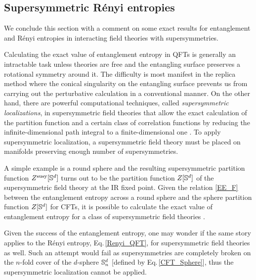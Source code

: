 \subsection{Supersymmetric R{\'e}nyi entropies}\label{ss:SRE}
We conclude this section with a comment on some exact results for entanglement and R{\'e}nyi entropies in interacting field theories with supersymmetries.

Calculating the exact value of entanglement entropy in QFTs is generally an intractable task unless theories are free and the entangling surface preserves a rotational symmetry around it.
The difficulty is most manifest in the replica method where the conical singularity on the entangling surface prevents us from carrying out the perturbative calculation in a conventional manner.
On the other hand, there are powerful computational techniques, called \emph{supersymmetric localizations}, in supersymmetric field theories that allow the exact calculation of the partition function and a certain class of correlation functions by reducing the infinite-dimensional path integral to a finite-dimensional one \cite{Willett:2016adv,Dumitrescu:2016ltq,Pufu:2016zxm}.
To apply supersymmetric localization, a supersymmetric field theory must be placed on manifolds preserving enough number of supersymmetries.

A simple example is a round sphere and the resulting supersymmetric partition function $Z^\text{susy}[\mathbb{S}^d]$ turns out to be the partition function $Z[\mathbb{S}^d]$ of the supersymmetric field theory at the IR fixed point.
Given the relation \eqref{EE_F} between the entanglement entropy across a round sphere and the sphere partition function $Z[\mathbb{S}^d]$ for CFTs, it is possible to calculate the exact value of entanglement entropy for a class of supersymmetric field theories \cite{Jafferis:2011zi,Pufu:2016zxm}.

Given the success of the entanglement entropy, one may wonder if the same story applies to the R{\'e}nyi entropy, Eq.\,\eqref{Renyi_QFT}, for supersymmetric field theories as well.
Such an attempt would fail as supersymmetries are completely broken on the $n$-fold cover of the $d$-sphere $\mathbb{S}^d_n$ [defined by Eq.\,\eqref{CFT_Sphere}], thus the supersymmetric localization cannot be applied.

